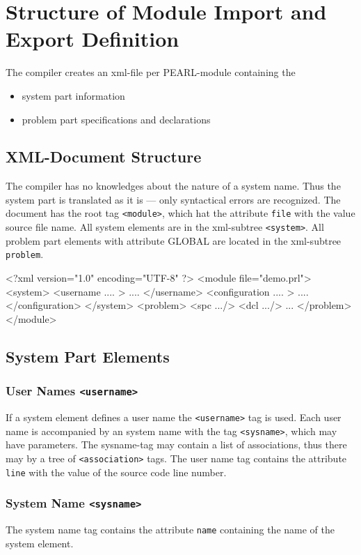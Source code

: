 \chapter{Structure of Module Import and Export Definition}

The compiler creates an xml-file per PEARL-module containing the
\begin{itemize}
\item system part information
\item problem part specifications and declarations
\end{itemize}

\section{XML-Document Structure}
The compiler has no knowledges about the nature of a system name.
Thus the system part is translated as it is --- only syntactical errors
are recognized. 
The document has the root tag \verb|<module>|, which hat the attribute
\verb|file| with the value source file name.  
All system elements are in the xml-subtree \verb|<system>|.
All problem part elements with attribute GLOBAL are located
in the xml-subtree \verb|problem|.

\begin{XMLCode}
<?xml version="1.0" encoding="UTF-8" ?>
<module file="demo.prl">
<system>
   <username .... >
   ....
   </username>
   <configuration .... >
   ....
   </configuration>
</system>
<problem>
  <spc .../>
  <dcl .../>
  ...
</problem>
</module>
\end{XMLCode}

\section{System Part Elements}
\subsection{User Names \texttt{<username>}}
If a system element defines a user name the \verb|<username>| tag is 
used. Each user name is accompanied by an system name with the tag 
\verb|<sysname>|, which may have parameters.
The sysname-tag may contain a list of associations, thus there may by a tree
of \verb|<association>| tags.
The user name tag contains the attribute \verb|line| with the value of the 
source code line number.

\subsection{System Name \texttt{<sysname>}}
\label{sec_system_names}
The system name tag contains the attribute \verb|name| containing the 
name of the system element.


